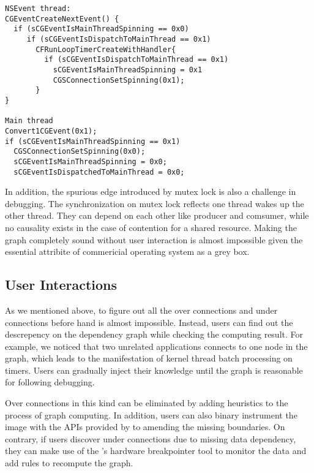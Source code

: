 {\footnotesize \begin{verbatim}
NSEvent thread:
CGEventCreateNextEvent() {
  if (sCGEventIsMainThreadSpinning == 0x0)
     if (sCGEventIsDispatchToMainThread == 0x1)
       CFRunLoopTimerCreateWithHandler{
         if (sCGEventIsDispatchToMainThread == 0x1)
           sCGEventIsMainThreadSpinning = 0x1
           CGSConnectionSetSpinning(0x1);
       }
}

Main thread
Convert1CGEvent(0x1);
if (sCGEventIsMainThreadSpinning == 0x1)
  CGSConnectionSetSpinning(0x0);
  sCGEventIsMainThreadSpinning = 0x0;
  sCGEventIsDispatchedToMainThread = 0x0;
\end{verbatim}
}

In addition, the spurious edge introduced by mutex lock is also a challenge in
debugging. The synchronization on mutex lock reflects one thread wakes up the
other thread. They can depend on each other like producer and comsumer, while
no causality exists in the case of contention for a shared resource. Making the
graph completely sound without user interaction is almost impossible given the
essential attribite of commericial operating system as a grey box.

\subsection{User Interactions}


As we mentioned above, to figure out all the over connections and under
connections before hand is almost impossible. Instead, users can find out the
descrepency on the dependency graph while checking the computing result. For
example, we noticed that two unrelated applications connects to one node in the
graph, which leads to the manifestation of kernel thread batch processing on
timers. Users can gradually inject their knowledge until the graph is reasonable
for following debugging.

Over connections in this kind can be eliminated by adding heuristics to the
process of graph computing. In addition, users can also binary instrument the
image with the APIs provided by \xxx to amending the missing boundaries. On
contrary, if users discover under connections due to missing data dependency,
they can make use of the \xxx's hardware breakpointer tool to monitor the data
and add rules to recompute the graph.

